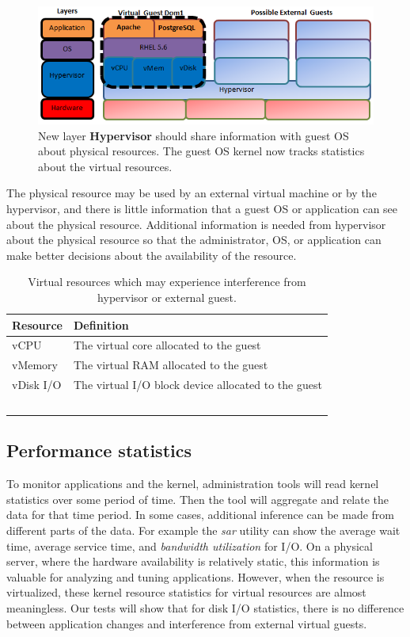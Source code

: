 \begin{figure}[!h]
  \begin{center}
  \includegraphics[width=6in]{images/LayersVirtual.png}
  \caption{New layer \textbf{Hypervisor} should share information with guest OS about physical resources.  The guest OS kernel now tracks statistics about the virtual resources.}
  \label{LayersAndResources}
  \end{center}
\end{figure}

The physical resource may be used by an external virtual machine or by the hypervisor, and there is little information that a guest OS or application can see about the physical resource.
Additional information is needed from hypervisor about the physical resource so that the administrator, OS, or application can make better decisions about the availability of the resource. 

\begin{table}[h]
  \begin{tabular}{ l p{10cm} }
    Resource & Definition \\
    \hline
    vCPU & The virtual core allocated to the guest \\
    vMemory & The virtual RAM allocated to the guest \\
    vDisk I/O & The virtual I/O block device allocated to the guest \\
    \hline
  \end{tabular}
\caption{Virtual resources which may experience interference from hypervisor or external guest.}
\label{tab:resources}
\end{table}

\subsection{Performance statistics}
To monitor applications and the kernel, administration tools will read kernel statistics over some period of time.  Then the tool will aggregate and relate the data for that time period.  In some cases, additional inference can be made from different parts of the data.  For example the \emph{sar} utility can show the average wait time, average service time, and \emph{bandwidth utilization} for I/O.  On a physical server, where the hardware availability is relatively static, this information is valuable for analyzing and tuning applications.  However, when the resource is virtualized, these kernel resource statistics for virtual resources are almost meaningless.  Our tests will show that for disk I/O statistics, there is no difference between application changes and interference from external virtual guests. 

